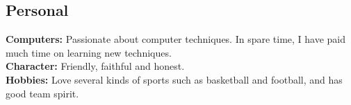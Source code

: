 \documentclass[line, margin, 11pt]{res}
\begin{document}
\begin{resume}
\section{Personal}
{\bf Computers:} Passionate about computer techniques. In spare time, I have paid much time on learning new techniques.\\
{\bf Character:} Friendly, faithful and honest.\\
{\bf Hobbies:} Love several kinds of sports such as basketball and football, and has good team spirit.\\
\end{resume}
\end{document}
